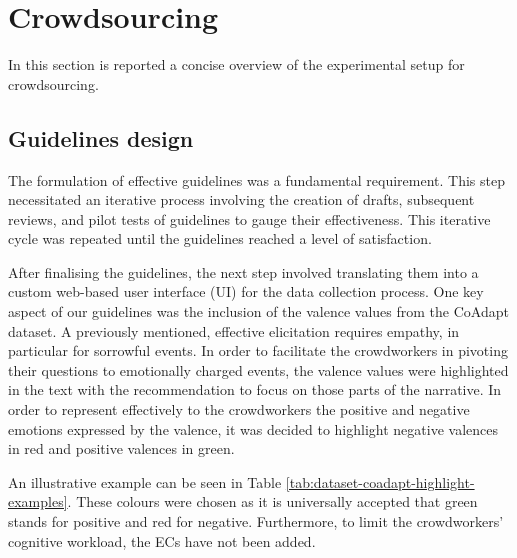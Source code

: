
\section{Crowdsourcing}
In this section is reported a concise overview of the experimental setup for crowdsourcing.
\subsection{Guidelines design}
The formulation of effective guidelines was a fundamental requirement. This step necessitated an iterative process involving the creation of drafts, subsequent reviews, and pilot tests of guidelines to gauge their effectiveness. This iterative cycle was repeated until the guidelines reached a level of satisfaction.

After finalising the guidelines, the next step involved translating them into a custom web-based user interface (UI) for the data collection process. One key aspect of our guidelines was the inclusion of the valence values from the CoAdapt dataset. 
A previously mentioned, effective elicitation requires empathy, in particular for sorrowful events. In order to facilitate the crowdworkers in pivoting their questions to emotionally charged events, the valence values were highlighted in the text with the recommendation to focus on those parts of the narrative. In order to represent effectively to the crowdworkers the positive and negative emotions expressed by the valence, it was decided to highlight negative valences in red and positive valences in green. 

An illustrative example can be seen in Table \ref{tab:dataset-coadapt-highlight-examples}. These colours were chosen as it is universally accepted that green stands for positive and red for negative. Furthermore, to limit the crowdworkers' cognitive workload, the ECs have not been added.

